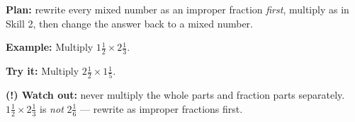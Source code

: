 \documentclass[12pt]{article}
\begin{document}
\begin{formulabox}
\textbf{Plan:} rewrite every mixed number as an improper fraction
\emph{first}, multiply as in Skill 2, then change the answer back to a mixed
number.
\end{formulabox}

\begin{examplebox}
\textbf{Example:} \quad Multiply $1\tfrac{1}{2} \times 2\tfrac{1}{3}$.
\end{examplebox}

\begin{tryitbox}
\textbf{Try it:} \quad Multiply $2\tfrac{1}{2} \times 1\tfrac{1}{5}$.\\[2pt]
\end{tryitbox}

\begin{watchoutbox}
\textbf{(!) Watch out:} never multiply the whole parts and fraction parts
separately. $1\tfrac{1}{2} \times 2\tfrac{1}{3}$ is \emph{not}
$2\tfrac{1}{6}$ --- rewrite as improper fractions first.
\end{watchoutbox}
\end{document}
